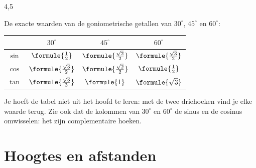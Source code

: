 \begin{alleenvoor}{4,5}
\begin{theorie}
De exacte waarden van de goniometrische getallen van $30^\circ$, $45^\circ$ en $60^\circ$:

\vspace{1mm}
\begin{center}
\renewcommand{\arraystretch}{1.6}
\begin{tabular}{|c|c|c|c|}
\hline
 & $30^\circ$ & $45^\circ$ & $60^\circ$ \\ \hline
$\sin$ & $\formule{\tfrac12}$ & $\formule{\tfrac{\sqrt2}{2}}$ & $\formule{\tfrac{\sqrt3}{2}}$ \\ \hline
$\cos$ & $\formule{\tfrac{\sqrt3}{2}}$ & $\formule{\tfrac{\sqrt2}{2}}$ & $\formule{\tfrac12}$ \\ \hline
$\tan$ & $\formule{\tfrac{\sqrt3}{3}}$ & $\formule{1}$ & $\formule{\sqrt3}$ \\ \hline
\end{tabular}
\end{center}
\end{theorie}

Je hoeft de tabel niet uit het hoofd te leren: met de twee driehoeken vind je elke waarde terug. Zie ook dat de kolommen van $30^\circ$ en $60^\circ$ de sinus en de cosinus omwisselen: het zijn complementaire hoeken.


\begin{oefeningen}
\end{oefeningen}
\end{alleenvoor}

\section{Hoogtes en afstanden}

